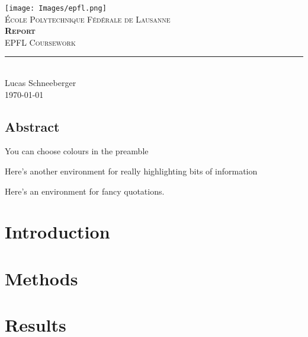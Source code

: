 \documentclass[11pt]{report}
\begin{document}
\begin{titlepage}
	\centering
    \texttt{[image: Images/epfl.png]}\\[0.25cm] 	%
    \textsc{\LARGE École Polytechnique Fédérale de Lausanne}\\ \vspace{\fill}
    \textbf{\textsc{\fontsize{50}{50}\selectfont Report}}\\ \vspace{\fill}		
	\textsc{\LARGE EPFL Coursework}\\[0.4cm]
	\rule{\linewidth}{0.2 mm} \\[0.5 cm]
	Lucas Schneeberger \\[2cm] \today
\end{titlepage}
\restoregeometry

\thispagestyle{numberonly}

\begin{summary}
\section*{Abstract}

You can choose colours in the preamble

\lipsum[1]
\end{summary}

\begin{invsummary}
Here's another environment for really highlighting bits of information

\lipsum[2]
\end{invsummary}

\begin{fquote}Here's an environment for fancy quotations. \lipsum[3]
\end{fquote}

\tableofcontents

\chapter{Introduction}


\chapter{Methods}


\chapter{Results}

\end{document}
